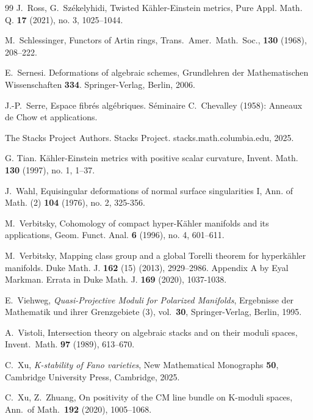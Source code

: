 \documentclass[12pt,twoside]{amsart}
\theoremstyle{definition}
\begin{document}
\begin{thebibliography}{99}
 J.~Ross, G.~Sz\'ekelyhidi, Twisted K\"ahler-Einstein metrics, Pure Appl. Math. Q. {\bf17} (2021), no. 3, 1025–1044.



 M.~Schlessinger, Functors of Artin rings, Trans.~Amer.~Math.~Soc., {\bf 130} (1968), 208--222.


 E.~Sernesi. Deformations of algebraic schemes, Grundlehren der Mathematischen Wissenschaften {\bf334}. Springer-Verlag, Berlin, 2006.

 J.-P.~Serre, Espace fibr\'{e}s alg\'{e}briques. S\'{e}minaire C.~Chevalley (1958): Anneaux de Chow et applications.



 The Stacks Project Authors. Stacks Project. stacks.math.columbia.edu, 2025.



 G. Tian.  K\"ahler-Einstein metrics with positive scalar curvature, Invent. Math. {\bf130} (1997),
no. 1, 1–37.



 J.~Wahl, Equisingular deformations of normal surface singularities I, Ann. of Math. (2) {\bf104} (1976), no. 2, 325-356.




 M.~Verbitsky, Cohomology of compact hyper-K\"ahler manifolds and its applications, Geom. Funct. Anal. {\bf6} (1996), no. 4, 601--611.

 M.~Verbitsky, Mapping class group and a global Torelli theorem for hyperk\"ahler manifolds. Duke Math. J. {\bf162} (15) (2013), 2929–2986. Appendix A by Eyal Markman. Errata in Duke Math. J. {\bf 169} (2020), 1037-1038.

 E.~Viehweg, {\it Quasi-Projective Moduli for Polarized Manifolds}, Ergebnisse der Mathematik und ihrer Grenzgebiete (3), vol.~{\bf30}, Springer-Verlag, Berlin, 1995.

 A.~Vistoli, Intersection theory on algebraic stacks and on their moduli spaces, Invent.~Math. {\bf97} (1989), 613--670.




 C.~Xu, {\it K-stability of Fano varieties}, New Mathematical Monographs {\bf50}, Cambridge University
Press, Cambridge, 2025.


 C.~Xu, Z.~Zhuang, On positivity of the CM line bundle on K-moduli spaces, Ann.~of Math.~{\bf192} (2020), 1005--1068. 


\end{thebibliography}
 
\end{document}
